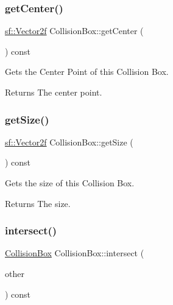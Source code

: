 \subsubsection{\texorpdfstring{getCenter()}{getCenter()}}
{\footnotesize\ttfamily \mbox{\hyperlink{classsf_1_1_vector2}{sf\+::\+Vector2f}} Collision\+Box\+::get\+Center (\begin{DoxyParamCaption}{ }\end{DoxyParamCaption}) const}



Gets the Center Point of this Collision Box. 

\begin{DoxyReturn}{Returns}
The center point. 
\end{DoxyReturn}
\mbox{\label{class_collision_box_ae75d128f52b9d2e81ad501f1795ead5c}} 
\subsubsection{\texorpdfstring{getSize()}{getSize()}}
{\footnotesize\ttfamily \mbox{\hyperlink{classsf_1_1_vector2}{sf\+::\+Vector2f}} Collision\+Box\+::get\+Size (\begin{DoxyParamCaption}{ }\end{DoxyParamCaption}) const}



Gets the size of this Collision Box. 

\begin{DoxyReturn}{Returns}
The size. 
\end{DoxyReturn}
\mbox{\label{class_collision_box_a55b61aaefbd11bcaa68c5ee0c2513d2c}} 
\subsubsection{\texorpdfstring{intersect()}{intersect()}\hspace{0.1cm}{\footnotesize\ttfamily [1/2]}}
{\footnotesize\ttfamily \mbox{\hyperlink{class_collision_box}{Collision\+Box}} Collision\+Box\+::intersect (\begin{DoxyParamCaption}\item[{const \mbox{\hyperlink{class_collision_box}{Collision\+Box}} \&}]{other }\end{DoxyParamCaption}) const}



